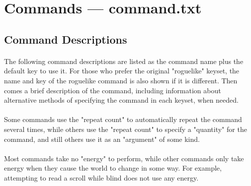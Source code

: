 \section{Commands --- command.txt}
\subsection{Command Descriptions} 
\paragraph{}
The following command descriptions are listed as the command name plus the
default key to use it. For those who prefer the original "roguelike"
keyset, the name and key of the roguelike command is also shown if it is
different. Then comes a brief description of the command, including
information about alternative methods of specifying the command in each
keyset, when needed.

\paragraph{}
Some commands use the "repeat count" to automatically repeat the command
several times, while others use the "repeat count" to specify a "quantity"
for the command, and still others use it as an "argument" of some
kind.

\paragraph{}
Most commands take no "energy" to perform, while other commands only take
energy when they cause the world to change in some way. For example,
attempting to read a scroll while blind does not use any energy.

